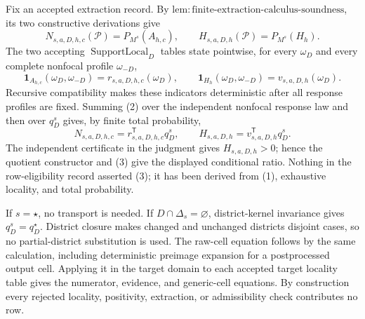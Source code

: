 Fix an accepted extraction record.  By \(\mathrm{lem:finite\text{-}extraction\text{-}calculus\text{-}soundness}\), its two constructive derivations give
\[
N_{s,a,D,h,c}(\mathcal P)=P_{M^s}(A_{h,c}),
\qquad
H_{s,a,D,h}(\mathcal P)=P_{M^s}(H_h).
\tag{1}
\]
The two accepting \(\operatorname{SupportLocal}_D\) tables state pointwise, for every \(\omega_D\) and every complete nonfocal profile \(\omega_{-D}\),
\[
\mathbf1_{A_{h,c}}(\omega_D,\omega_{-D})=r_{s,a,D,h,c}(\omega_D),
\qquad
\mathbf1_{H_h}(\omega_D,\omega_{-D})=v_{s,a,D,h}(\omega_D).
\tag{2}
\]
Recursive compatibility makes these indicators deterministic after all response profiles are fixed.  Summing (2) over the independent nonfocal response law and then over \(q_D^s\) gives, by finite total probability,
\[
N_{s,a,D,h,c}=r_{s,a,D,h,c}^{\mathsf T}q_D^s,
\qquad
H_{s,a,D,h}=v_{s,a,D,h}^{\mathsf T}q_D^s.
\tag{3}
\]
The independent certificate in the judgment gives \(H_{s,a,D,h}>0\); hence the quotient constructor and (3) give the displayed conditional ratio.  Nothing in the row-eligibility record asserted (3); it has been derived from (1), exhaustive locality, and total probability.

If \(s=\star\), no transport is needed.  If \(D\cap\Delta_s=\varnothing\), district-kernel invariance gives \(q_D^s=q_D^\star\).  District closure makes changed and unchanged districts disjoint cases, so no partial-district substitution is used.  The raw-cell equation follows by the same calculation, including deterministic preimage expansion for a postprocessed output cell.  Applying it in the target domain to each accepted target locality table gives the numerator, evidence, and generic-cell equations.  By construction every rejected locality, positivity, extraction, or admissibility check contributes no row.